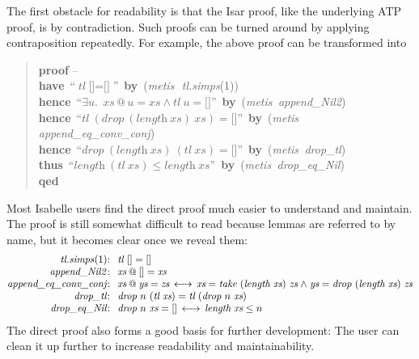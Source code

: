 \documentclass[withtimes,a4paper,12pt]{easychair}
\newcommand\keyw[1]{\textsf{\textbf{#1}}}
\begin{document}
The first obstacle for readability is that the Isar proof, like the
underlying ATP proof, is by contradiction. Such proofs can be turned
around by applying contraposition repeatedly. For example, the above
proof can be transformed into
%
\begin{quote}
\keyw{proof} -- \\
\hbox{}\quad \keyw{have}\, ``$\textit{tl}~\text{[]} = \text{[]}$'' \keyw{\,by\,} (\textit{metis}\,~\textit{tl.simps\/}(1)) \\
\hbox{}\quad \keyw{hence}\, ``$\exists\textit{u}.\;\, \textit{xs} \mathbin{@} \textit{u} = \textit{xs} \mathrel{\land} \textit{tl}~\textit{u} = \text{[]}$'' \keyw{\,by\,} (\textit{metis\, append\_Nil2}) \\
\hbox{}\quad \keyw{hence}\, ``$\textit{tl}~(\textit{drop}~(\textit{length}~\textit{xs})~\textit{xs}) = \text{[]}$'' \keyw{\,by\,} (\textit{metis\, append\_eq\_conv\_conj\/}) \\
\hbox{}\quad \keyw{hence}\, ``$\textit{drop}~(\textit{length}~\textit{xs})~(\textit{tl}~\textit{xs}) = \text{[]}$'' \keyw{\,by\,} (\textit{metis\, drop\_tl\/}) \\
\hbox{}\quad \keyw{thus}\, ``$\textit{length}~(\textit{tl}~\textit{xs}) \le \textit{length}~\textit{xs}$'' \keyw{\,by\,} (\textit{metis\, drop\_eq\_Nil\/}) \\
\keyw{qed}
\end{quote}
%
Most Isabelle users find the direct proof much easier to understand
and maintain. The proof is still somewhat difficult to read because
lemmas are referred to by name, but it becomes clear once we reveal
them:
\[\hbox{\begin{tabular}{@{}r@{\kern.75em}l@{}}%
\textit{tl.simps\/}(1): & $\textit{tl}~\text{[]} = \text{[]}$ \\
\textit{append\_Nil2\/}: & $\textit{xs} \mathbin{@} \text{[]} = \textit{xs}$ \\
\textit{append\_eq\_conv\_conj\/}: & $\textit{xs} \mathbin{@} \textit{ys} = \textit{zs} \,\longleftrightarrow\,
\textit{xs} = \textit{take}~(\textit{length}~\textit{xs})~\textit{zs} \mathrel{\land}
\textit{ys} = \textit{drop}~(\textit{length}~\textit{xs})~\textit{zs}$ \\
\textit{drop\_tl\/}: & $\textit{drop}~n~(\textit{tl}~\textit{xs}) = \textit{tl}~(\textit{drop}~n~\textit{xs})$ \\
\textit{drop\_eq\_Nil\/}: & $\textit{drop}~n~\textit{xs} = \text{[]} \,\longleftrightarrow\, \textit{length}~\textit{xs} \leq n$
\end{tabular}}\]
The direct proof also forms a good basis for further development: The
user can clean it up further to increase readability and
maintainability.
\end{document}

